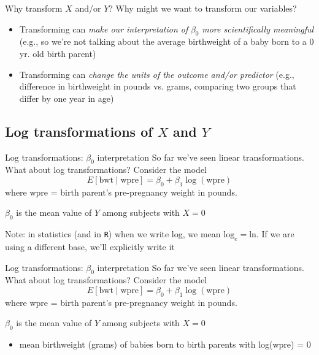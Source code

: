 \documentclass[10pt,t]{beamer}
\begin{document}
\begin{frame}{Why transform $X$ and/or $Y$?}
Why might we want to transform our variables?

\begin{itemize}
	\item Transforming can \textit{make our interpretation of} $\beta_0$ \textit{more scientifically meaningful} (e.g., so we're not talking about the average birthweight of a baby born to a 0 yr. old birth parent)
	\item Transforming can \textit{change the units of the outcome and/or predictor} (e.g., difference in birthweight in pounds vs. grams, comparing two groups that differ by one year in age)
\end{itemize}
\end{frame}

\subsection{Log transformations of $X$ and $Y$}

\begin{frame}{Log transformations: $\beta_0$ interpretation}
So far we've seen linear transformations. What about log transformations? Consider the model
$$
E[\text{bwt} \mid \text{wpre}] = \beta_0 + \beta_1 \log(\text{wpre})
$$
where wpre = birth parent's pre-pregnancy weight in pounds.

\vspace{0.3cm}

$\beta_0$ is the mean value of $Y$ among subjects with $X = 0$

\vspace{0.3cm}

\tiny *Note: in statistics (and in \texttt{R}) when we write log, we mean $\text{log}_e = \text{ln}$. If we are using a different base, we'll explicitly write it

\end{frame}

\begin{frame}{Log transformations: $\beta_0$ interpretation}
So far we've seen linear transformations. What about log transformations? Consider the model
$$
E[\text{bwt} \mid \text{wpre}] = \beta_0 + \beta_1 \log(\text{wpre})
$$
where wpre = birth parent's pre-pregnancy weight in pounds.

\vspace{0.3cm}

$\beta_0$ is the mean value of $Y$ among subjects with $X = 0$

\begin{itemize}
	\item[] mean birthweight (grams) of babies born to birth parents with log(wpre) = 0
\end{itemize}

\end{frame}
\end{document}
